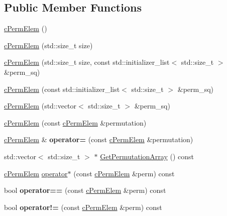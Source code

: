\subsection*{\-Public \-Member \-Functions}
\begin{DoxyCompactItemize}
\item 
\hyperlink{classcPermElem_a9170fa558dd3cdfae7879631db41235d}{c\-Perm\-Elem} ()
\item 
\hyperlink{classcPermElem_ad3ff2e93580acca710249f0eb7e04bc3}{c\-Perm\-Elem} (std\-::size\-\_\-t size)
\item 
\hyperlink{classcPermElem_a375e3da4877dd48e93ca192bfcd66ddd}{c\-Perm\-Elem} (std\-::size\-\_\-t size, const std\-::initializer\-\_\-list$<$ std\-::size\-\_\-t $>$ \&perm\-\_\-sq)
\item 
\hyperlink{classcPermElem_a88b976442227c8da9ede9cf9d3f865c5}{c\-Perm\-Elem} (const std\-::initializer\-\_\-list$<$ std\-::size\-\_\-t $>$ \&perm\-\_\-sq)
\item 
\hyperlink{classcPermElem_a05895c11888d83bc3d35b3c18d90e8e4}{c\-Perm\-Elem} (std\-::vector$<$ std\-::size\-\_\-t $>$ \&perm\-\_\-sq)
\item 
\hyperlink{classcPermElem_a9cdd0f485986e63a7a848a058aecf402}{c\-Perm\-Elem} (const \hyperlink{classcPermElem}{c\-Perm\-Elem} \&permutation)
\item 
\hypertarget{classcPermElem_a9c05e75d5c9ce57fafc2cee73e396a58}{
\hyperlink{classcPermElem}{c\-Perm\-Elem} \& {\bfseries operator=} (const \hyperlink{classcPermElem}{c\-Perm\-Elem} \&permutation)}
\label{classcPermElem_a9c05e75d5c9ce57fafc2cee73e396a58}

\item 
std\-::vector$<$ std\-::size\-\_\-t $>$ $\ast$ \hyperlink{classcPermElem_a0d0bfc94a1d7cf92d514293253acf8be}{\-Get\-Permutation\-Array} () const 
\item 
\hyperlink{classcPermElem}{c\-Perm\-Elem} \hyperlink{classcPermElem_a19da6e521f8adf3d252250f3836c563e}{operator$\ast$} (const \hyperlink{classcPermElem}{c\-Perm\-Elem} \&perm) const 
\item 
\hypertarget{classcPermElem_a925aac2e4ac73ec288b7a1e16b941d40}{
bool {\bfseries operator==} (const \hyperlink{classcPermElem}{c\-Perm\-Elem} \&perm) const }
\label{classcPermElem_a925aac2e4ac73ec288b7a1e16b941d40}

\item 
\hypertarget{classcPermElem_a925cdee12dcc4914417143a88d91c49d}{
bool {\bfseries operator!=} (const \hyperlink{classcPermElem}{c\-Perm\-Elem} \&perm) const }
\label{classcPermElem_a925cdee12dcc4914417143a88d91c49d}


\end{DoxyCompactItemize}
